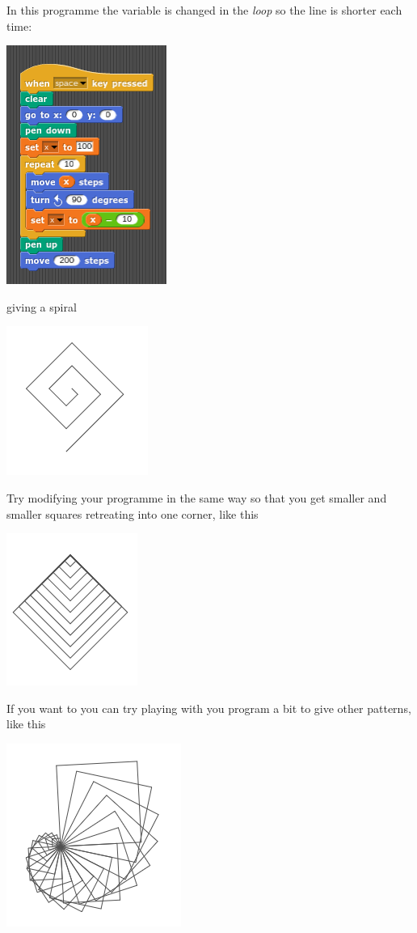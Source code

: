 \documentclass[11pt,a4paper]{scrartcl}
\begin{document}
In this programme the variable is changed in the \textsl{loop} so the
line is shorter each time:
\begin{center}
\includegraphics{spiral.png}
\end{center}
giving a spiral
\begin{center}
\includegraphics{spiral_pic.png}
\end{center}
Try modifying your programme in the same way so that you get smaller and smaller squares retreating into one corner, like this
\begin{center}
\includegraphics{repeat_squares_pic.png}
\end{center}
If you want to you can try playing with you program a bit to give other patterns, like this
\begin{center}
\includegraphics{squares_spiral_pic.png}
\end{center}
\end{document}
